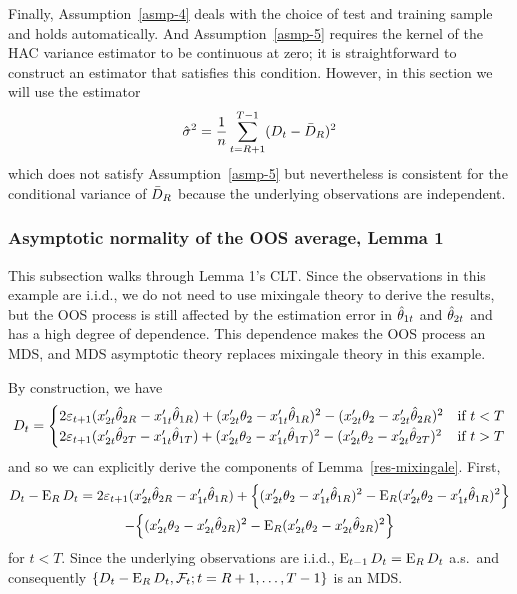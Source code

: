 \documentclass[12pt]{article}
\begin{document}
Finally, Assumption~\ref{asmp-4} deals with the choice of test and
training sample and holds automatically. And Assumption~\ref{asmp-5}
requires the kernel of the HAC variance estimator to be continuous at
zero; it is straightforward to construct an estimator that satisfies
this condition. However, in this section we will use the estimator
\begin{equation*}
  \hat{\sigma}^2 = \frac{1}{n} \sum_{t=R+1}^{T-1} (D_t - \bar{D}_{R})^2
\end{equation*}
which does not satisfy Assumption~\ref{asmp-5} but nevertheless is
consistent for the conditional variance of $\bar{D}_{R}$ because the
underlying observations are independent.

\subsubsection*{Asymptotic normality of the OOS average, Lemma 1}

This subsection walks through Lemma 1's CLT. Since the observations in
this example are i.i.d., we do not need to use mixingale theory to
derive the results, but the OOS process is still affected by the
estimation error in $\hat\theta_{1t}$ and $\hat\theta_{2t}$ and has a high degree of
dependence. This dependence makes the OOS process an MDS, and MDS
asymptotic theory replaces mixingale theory in this example.

By construction, we have
\begin{equation*}
  D_t =
  \begin{cases}
    2 \varepsilon_{t+1} (x_{2t}'\hat\theta_{2R} - x_{1t}'\hat\theta_{1R})
    + (x_{2t}'\theta_2 - x_{1t}'\hat\theta_{1R})^2
    - (x_{2t}'\theta_2 - x_{2t}'\hat\theta_{2R})^2
    & \text{if } t < T \\
    2 \varepsilon_{t+1} (x_{2t}'\hat\theta_{2T} - x_{1t}'\hat\theta_{1T})
    + (x_{2t}'\theta_2 - x_{1t}'\hat\theta_{1T})^2
    - (x_{2t}'\theta_2 - x_{2t}'\hat\theta_{2T})^2
    & \text{if } t > T
  \end{cases}
\end{equation*}
and so we can explicitly derive the components of
Lemma~\ref{res-mixingale}. First,
\begin{multline*}
  D_t - \operatorname{E}_R D_t
  = 2 \varepsilon_{t+1} (x_{2t}'\hat\theta_{2R} - x_{1t}'\hat\theta_{1R})
  + \Big\{(x_{2t}'\theta_2 - x_{1t}'\hat\theta_{1R})^2
          - \operatorname{E}_R (x_{2t}'\theta_2 - x_{1t}'\hat\theta_{1R})^2 \Big\} \\
  - \Big\{(x_{2t}'\theta_2 - x_{2t}'\hat\theta_{2R})^2
          - \operatorname{E}_R (x_{2t}'\theta_2 - x_{2t}'\hat\theta_{2R})^2 \Big\}
\end{multline*}
for $t < T$. Since the underlying observations are i.i.d., $\operatorname{E}_{t-1}
D_t = \operatorname{E}_R D_t$ a.s.\ and consequently $\{D_t - \operatorname{E}_R D_t, \mathcal{F}_{t};
t=R+1,\dots,T-1\}$ is an MDS.
\end{document}
